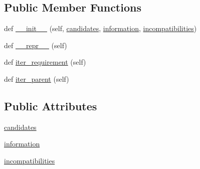 \subsection*{Public Member Functions}
\begin{DoxyCompactItemize}
\item 
def \hyperlink{classpip_1_1__vendor_1_1resolvelib_1_1resolvers_1_1Criterion_ae24643d51c3ff79684252f228b4a2d35}{\+\_\+\+\_\+init\+\_\+\+\_\+} (self, \hyperlink{classpip_1_1__vendor_1_1resolvelib_1_1resolvers_1_1Criterion_a2f33a3e74b7dca5f161000ba52d3e59f}{candidates}, \hyperlink{classpip_1_1__vendor_1_1resolvelib_1_1resolvers_1_1Criterion_a91c2ba5379d097de54c71ad0791f48cb}{information}, \hyperlink{classpip_1_1__vendor_1_1resolvelib_1_1resolvers_1_1Criterion_aca2865ea5b7ae29e0259f8bb02b6604e}{incompatibilities})
\item 
def \hyperlink{classpip_1_1__vendor_1_1resolvelib_1_1resolvers_1_1Criterion_ab215e18fb028a704c307317e20704831}{\+\_\+\+\_\+repr\+\_\+\+\_\+} (self)
\item 
def \hyperlink{classpip_1_1__vendor_1_1resolvelib_1_1resolvers_1_1Criterion_a957b9ccee33b003b5ebcac712003eeaa}{iter\+\_\+requirement} (self)
\item 
def \hyperlink{classpip_1_1__vendor_1_1resolvelib_1_1resolvers_1_1Criterion_a630a062f9700c152a5130c3b443e74d6}{iter\+\_\+parent} (self)
\end{DoxyCompactItemize}
\subsection*{Public Attributes}
\begin{DoxyCompactItemize}
\item 
\hyperlink{classpip_1_1__vendor_1_1resolvelib_1_1resolvers_1_1Criterion_a2f33a3e74b7dca5f161000ba52d3e59f}{candidates}
\item 
\hyperlink{classpip_1_1__vendor_1_1resolvelib_1_1resolvers_1_1Criterion_a91c2ba5379d097de54c71ad0791f48cb}{information}
\item 
\hyperlink{classpip_1_1__vendor_1_1resolvelib_1_1resolvers_1_1Criterion_aca2865ea5b7ae29e0259f8bb02b6604e}{incompatibilities}
\end{DoxyCompactItemize}



